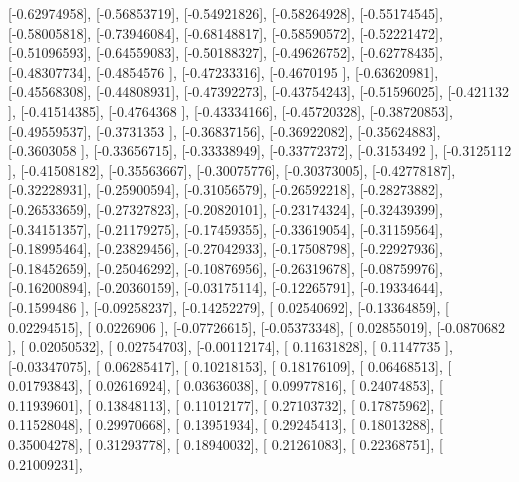 \documentclass{article}
\begin{document}
       [-0.62974958],
       [-0.56853719],
       [-0.54921826],
       [-0.58264928],
       [-0.55174545],
       [-0.58005818],
       [-0.73946084],
       [-0.68148817],
       [-0.58590572],
       [-0.52221472],
       [-0.51096593],
       [-0.64559083],
       [-0.50188327],
       [-0.49626752],
       [-0.62778435],
       [-0.48307734],
       [-0.4854576 ],
       [-0.47233316],
       [-0.4670195 ],
       [-0.63620981],
       [-0.45568308],
       [-0.44808931],
       [-0.47392273],
       [-0.43754243],
       [-0.51596025],
       [-0.421132  ],
       [-0.41514385],
       [-0.4764368 ],
       [-0.43334166],
       [-0.45720328],
       [-0.38720853],
       [-0.49559537],
       [-0.3731353 ],
       [-0.36837156],
       [-0.36922082],
       [-0.35624883],
       [-0.3603058 ],
       [-0.33656715],
       [-0.33338949],
       [-0.33772372],
       [-0.3153492 ],
       [-0.3125112 ],
       [-0.41508182],
       [-0.35563667],
       [-0.30075776],
       [-0.30373005],
       [-0.42778187],
       [-0.32228931],
       [-0.25900594],
       [-0.31056579],
       [-0.26592218],
       [-0.28273882],
       [-0.26533659],
       [-0.27327823],
       [-0.20820101],
       [-0.23174324],
       [-0.32439399],
       [-0.34151357],
       [-0.21179275],
       [-0.17459355],
       [-0.33619054],
       [-0.31159564],
       [-0.18995464],
       [-0.23829456],
       [-0.27042933],
       [-0.17508798],
       [-0.22927936],
       [-0.18452659],
       [-0.25046292],
       [-0.10876956],
       [-0.26319678],
       [-0.08759976],
       [-0.16200894],
       [-0.20360159],
       [-0.03175114],
       [-0.12265791],
       [-0.19334644],
       [-0.1599486 ],
       [-0.09258237],
       [-0.14252279],
       [ 0.02540692],
       [-0.13364859],
       [ 0.02294515],
       [ 0.0226906 ],
       [-0.07726615],
       [-0.05373348],
       [ 0.02855019],
       [-0.0870682 ],
       [ 0.02050532],
       [ 0.02754703],
       [-0.00112174],
       [ 0.11631828],
       [ 0.1147735 ],
       [-0.03347075],
       [ 0.06285417],
       [ 0.10218153],
       [ 0.18176109],
       [ 0.06468513],
       [ 0.01793843],
       [ 0.02616924],
       [ 0.03636038],
       [ 0.09977816],
       [ 0.24074853],
       [ 0.11939601],
       [ 0.13848113],
       [ 0.11012177],
       [ 0.27103732],
       [ 0.17875962],
       [ 0.11528048],
       [ 0.29970668],
       [ 0.13951934],
       [ 0.29245413],
       [ 0.18013288],
       [ 0.35004278],
       [ 0.31293778],
       [ 0.18940032],
       [ 0.21261083],
       [ 0.22368751],
       [ 0.21009231],
\end{document}
